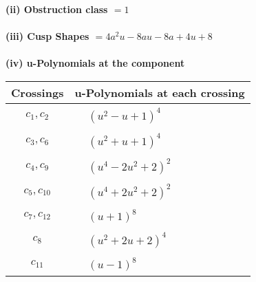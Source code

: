 \documentclass[1p]{elsarticle_modified}
\theoremstyle{definition}
\begin{document}
\flushleft \textbf{(ii) Obstruction class $= 1$}\\~\\
\flushleft \textbf{(iii) Cusp Shapes $= 4 a^2 u-8 a u-8 a+4 u+8$}\\~\\
\newpage\renewcommand{\arraystretch}{1}
\flushleft \textbf{(iv) u-Polynomials at the component}\newline \\
\begin{tabular}{m{50pt}|m{274pt}}
Crossings & \hspace{64pt}u-Polynomials at each crossing \\
\hline $$\begin{aligned}c_{1},c_{2}\end{aligned}$$&$\begin{aligned}
&(u^2- u+1)^4
\end{aligned}$\\
\hline $$\begin{aligned}c_{3},c_{6}\end{aligned}$$&$\begin{aligned}
&(u^2+u+1)^4
\end{aligned}$\\
\hline $$\begin{aligned}c_{4},c_{9}\end{aligned}$$&$\begin{aligned}
&(u^4-2 u^2+2)^2
\end{aligned}$\\
\hline $$\begin{aligned}c_{5},c_{10}\end{aligned}$$&$\begin{aligned}
&(u^4+2 u^2+2)^2
\end{aligned}$\\
\hline $$\begin{aligned}c_{7},c_{12}\end{aligned}$$&$\begin{aligned}
&(u+1)^8
\end{aligned}$\\
\hline $$\begin{aligned}c_{8}\end{aligned}$$&$\begin{aligned}
&(u^2+2 u+2)^4
\end{aligned}$\\
\hline $$\begin{aligned}c_{11}\end{aligned}$$&$\begin{aligned}
&(u-1)^8
\end{aligned}$\\
\hline
\end{tabular}\\~\\
\end{document}

